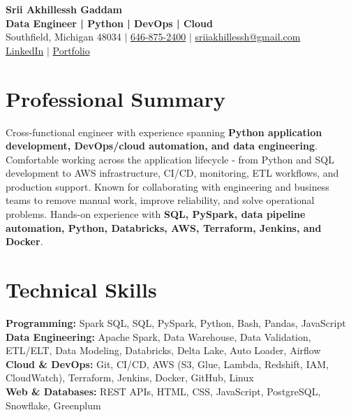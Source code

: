 \documentclass[letterpaper,10pt]{article}
\begin{document}
\fontsize{9.35pt}{10.45pt}\selectfont

\begin{center}
    {\LARGE \textbf{Srii Akhillessh Gaddam}} \\[-1pt]
    \textbf{Data Engineer | Python | DevOps | Cloud} \\[2pt]
    Southfield, Michigan 48034 $|$
    \href{tel:6468752400}{646-875-2400} $|$
    \href{mailto:sriiakhillessh@gmail.com}{sriiakhillessh@gmail.com} \\[1pt]
    \href{https://www.linkedin.com/in/srii-akhiilessh-gaddam-b48668191/}{LinkedIn} $|$
    \href{https://sriiakhillesshg.github.io/portfolio/}{Portfolio}
\end{center}
\vspace{-8pt}

\section{Professional Summary}
\small{Cross-functional engineer with experience spanning \textbf{Python application development, DevOps/cloud automation, and data engineering}. Comfortable working across the application lifecycle - from Python and SQL development to AWS infrastructure, CI/CD, monitoring, ETL workflows, and production support. Known for collaborating with engineering and business teams to remove manual work, improve reliability, and solve operational problems. Hands-on experience with \textbf{SQL, PySpark, data pipeline automation, Python, Databricks, AWS, Terraform, Jenkins, and Docker}.}

\section{Technical Skills}
\small{
\textbf{Programming:} Spark SQL, SQL, PySpark, Python, Bash, Pandas, JavaScript \\
\textbf{Data Engineering:} Apache Spark, Data Warehouse, Data Validation, ETL/ELT, Data Modeling, Databricks, Delta Lake, Auto Loader, Airflow \\
\textbf{Cloud \& DevOps:} Git, CI/CD, AWS (S3, Glue, Lambda, Redshift, IAM, CloudWatch), Terraform, Jenkins, Docker, GitHub, Linux \\
\textbf{Web \& Databases:} REST APIs, HTML, CSS, JavaScript, PostgreSQL, Snowflake, Greenplum
}
\end{document}

